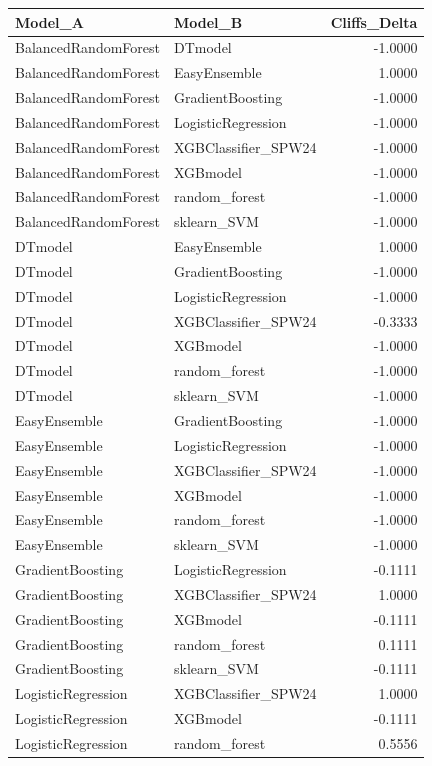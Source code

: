 \begin{table}[t]
\centering
\begin{tabular}{llr}
\toprule
Model_A & Model_B & Cliffs_Delta \\
\midrule
BalancedRandomForest & DTmodel & -1.0000 \\
BalancedRandomForest & EasyEnsemble & 1.0000 \\
BalancedRandomForest & GradientBoosting & -1.0000 \\
BalancedRandomForest & LogisticRegression & -1.0000 \\
BalancedRandomForest & XGBClassifier_SPW24 & -1.0000 \\
BalancedRandomForest & XGBmodel & -1.0000 \\
BalancedRandomForest & random_forest & -1.0000 \\
BalancedRandomForest & sklearn_SVM & -1.0000 \\
DTmodel & EasyEnsemble & 1.0000 \\
DTmodel & GradientBoosting & -1.0000 \\
DTmodel & LogisticRegression & -1.0000 \\
DTmodel & XGBClassifier_SPW24 & -0.3333 \\
DTmodel & XGBmodel & -1.0000 \\
DTmodel & random_forest & -1.0000 \\
DTmodel & sklearn_SVM & -1.0000 \\
EasyEnsemble & GradientBoosting & -1.0000 \\
EasyEnsemble & LogisticRegression & -1.0000 \\
EasyEnsemble & XGBClassifier_SPW24 & -1.0000 \\
EasyEnsemble & XGBmodel & -1.0000 \\
EasyEnsemble & random_forest & -1.0000 \\
EasyEnsemble & sklearn_SVM & -1.0000 \\
GradientBoosting & LogisticRegression & -0.1111 \\
GradientBoosting & XGBClassifier_SPW24 & 1.0000 \\
GradientBoosting & XGBmodel & -0.1111 \\
GradientBoosting & random_forest & 0.1111 \\
GradientBoosting & sklearn_SVM & -0.1111 \\
LogisticRegression & XGBClassifier_SPW24 & 1.0000 \\
LogisticRegression & XGBmodel & -0.1111 \\
LogisticRegression & random_forest & 0.5556 \\

\end{tabular}
\end{table}
